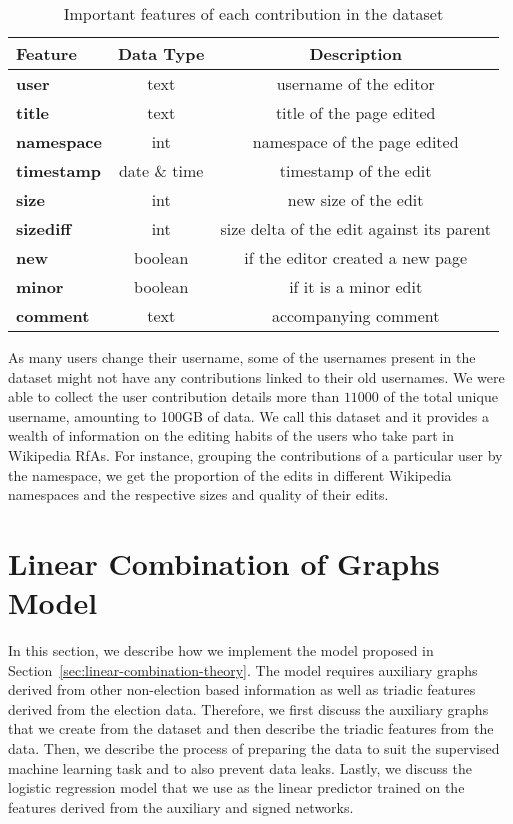 \begin{table}[htp]
    \centering
    \caption{Important features of each contribution in the \usercontrib dataset}
    \label{tab:usercontrib-features}
    \begin{tabular}{lcc}
        \toprule
        Feature & Data Type & Description\\
        \midrule
        \textbf{user}&text& username of the editor\\
        \textbf{title}&text & title of the page edited\\
        \textbf{namespace}&int& namespace of the page edited\\
        \textbf{timestamp}&date \& time & timestamp of the edit\\
        \textbf{size}&int& new size of the edit \\
        \textbf{sizediff}& int & size delta of the edit against its parent\\
        \textbf{new}&boolean &if the editor created a new page \\
        \textbf{minor}&boolean& if it is a minor edit\\
        \textbf{comment}& text& accompanying comment\\
        \bottomrule
    \end{tabular}
\end{table}
As many users change their username, some of the usernames present in the \wikirfa dataset might not have any contributions linked to their old usernames.
We were able to collect the user contribution details more than $11000$ of the total unique username, amounting to 100GB of data.
We call this dataset \usercontrib and it provides a wealth of information on the editing habits of the users who take part in Wikipedia RfAs. 
For instance, grouping the contributions of a particular user by the namespace, we get the proportion of the edits in different Wikipedia namespaces and the respective sizes and quality of their edits.

\section{Linear Combination of Graphs Model}
\label{sec:linear-combination-implementation}
In this section, we describe how we implement the model proposed in Section~\ref{sec:linear-combination-theory}.
The model requires auxiliary graphs derived from other non-election based information as well as triadic features derived from the election data.
Therefore, we first discuss the auxiliary graphs that we create from the \usercontrib dataset and then describe the triadic features from the \wikirfa data.
Then, we describe the process of preparing the data to suit the supervised machine learning task and to also prevent data leaks.
Lastly, we discuss the logistic regression model that we use as the linear predictor trained on the features derived from the auxiliary and signed networks.

